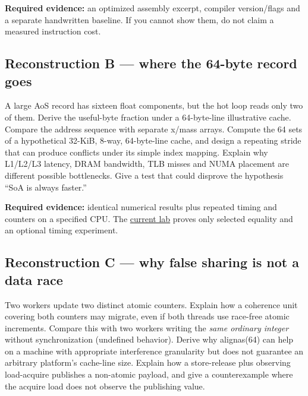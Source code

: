 \textbf{Required evidence:} an optimized assembly excerpt, compiler version/flags and a separate handwritten baseline. If you cannot show them, do not claim a measured instruction cost.

\subsection{Reconstruction B --- where the 64-byte record goes}\label{appendix-2587680a4fe3-reconstruction-b-where-the-64-byte-record-goes}

\hypertarget{appendix-2587680a4fe3-reconstruction-b-where-the-64-byte-record-goes}{}

A large AoS record has sixteen float components, but the hot loop reads only two of them. Derive the useful-byte fraction under a 64-byte-line illustrative cache. Compare the address sequence with separate x/mass arrays. Compute the 64 sets of a hypothetical 32-KiB, 8-way, 64-byte-line cache, and design a repeating stride that can produce conflicts under its simple index mapping. Explain why L1/L2/L3 latency, DRAM bandwidth, TLB misses and NUMA placement are different possible bottlenecks. Give a test that could disprove the hypothesis ``SoA is always faster.''

\textbf{Required evidence:} identical numerical results plus repeated timing and counters on a specified CPU. The \hyperref[source-file-0060a91bd24dd25d6c14e679]{current lab} proves only selected equality and an optional timing experiment.

\subsection{Reconstruction C --- why false sharing is not a data race}\label{appendix-2587680a4fe3-reconstruction-c-why-false-sharing-is-not-a-data-race}

\hypertarget{appendix-2587680a4fe3-reconstruction-c-why-false-sharing-is-not-a-data-race}{}

Two workers update two distinct atomic counters. Explain how a coherence unit covering both counters may migrate, even if both threads use race-free atomic increments. Compare this with two workers writing the \emph{same ordinary integer} without synchronization (undefined behavior). Derive why alignas(64) can help on a machine with appropriate interference granularity but does not guarantee an arbitrary platform's cache-line size. Explain how a store-release plus observing load-acquire publishes a non-atomic payload, and give a counterexample where the acquire load does not observe the publishing value.

